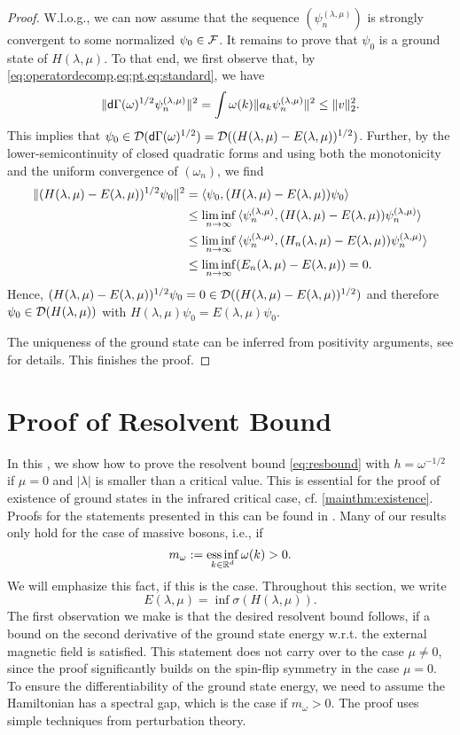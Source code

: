 \documentclass[a4paper,12pt,oneside]{article}
\newcommand{\pln}{\psi_n^{(\lambda,\mu)}}
\begin{document}
\begin{proof}
	W.l.o.g., we can now assume that the sequence $(\pln)$ is strongly convergent to some normalized $\psi_0\in {\mathcal F}$. It remains to prove that $\psi_0$ is a ground state of $H(\lambda,\mu)$. To that end, we first observe that, by \cref{eq:operatordecomp,eq:pt,eq:standard}, we have
	\[ \|\dG(\omega)^{1/2}\pln\|^2 = \int \omega(k)\|a_k\pln\|^2 \le \|v\|_2^2.  \]
	This implies that $\psi_0\in{\mathcal D}({\mathsf d}\Gamma(\omega)^{1/2})={\mathcal D}((H(\lambda,\mu)-E(\lambda,\mu))^{1/2})$. Further, by the lower-semicontinuity of closed quadratic forms and using both the monotonicity and the uniform convergence of $(\omega_n)$, we find 
	\begin{align*}
		\|(H(\lambda,\mu)-E(\lambda,\mu))^{1/2}\psi_0\|^2 &= \braket{\psi_0,(H(\lambda,\mu)-E(\lambda,\mu))\psi_0} \\&\le \liminf_{n\to\infty}\braket{\pln,(H(\lambda,\mu)-E(\lambda,\mu))\pln}\\ & \le \liminf_{n\to\infty}\braket{\pln,(H_n(\lambda,\mu)-E(\lambda,\mu))\pln}\\
		&\le \liminf_{n\to\infty}(E_n(\lambda,\mu)-E(\lambda,\mu)) = 0.
	\end{align*}
	Hence, $(H(\lambda,\mu)-E(\lambda,\mu))^{1/2}\psi_0=0\in {\mathcal D}((H(\lambda,\mu)-E(\lambda,\mu))^{1/2})$ and therefore $\psi_0\in{\mathcal D}(H(\lambda,\mu))$ with $H(\lambda,\mu)\psi_0=E(\lambda,\mu)\psi_0$.
	
	The uniqueness of the ground state can be inferred from positivity arguments, see \cite[Proposition 3.6]{HaslerHinrichsSiebert.2021c} for details.
	This finishes the proof.
\end{proof}

\section{Proof of Resolvent Bound}\label{sec:resolventbound}

In this , we show how to prove the resolvent bound \cref{eq:resbound} with $h=\omega^{-1/2}$ if $\mu=0$ and $|\lambda|$ is smaller than a critical value. This is essential for the proof of existence of ground states in the infrared critical case, cf. \cref{mainthm:existence}. Proofs for the statements presented in this  can be found in \cite{HaslerHinrichsSiebert.2021b,HaslerHinrichsSiebert.2021c}. Many of our results only hold for the case of massive bosons, i.e., if
\[ m_\omega := \operatorname*{ess\,inf}_{k\in{\mathbb R}^d} \omega(k)>0. \]
We will emphasize this fact, if this is the case. %
Throughout this section, we write
\[E(\lambda,\mu) = \inf\sigma(H(\lambda,\mu)).\]
%
The first observation we make is that the desired resolvent bound follows, if a bound on the second derivative of the ground state energy w.r.t. the external magnetic field is satisfied. This statement does not carry over to the case $\mu\ne 0$, since the proof significantly builds on the spin-flip symmetry in the case $\mu=0$. To ensure the differentiability of the ground state energy, we need to assume the Hamiltonian has a spectral gap, which is the case if $m_\omega>0$. The proof uses simple techniques from perturbation theory.
\end{document}
